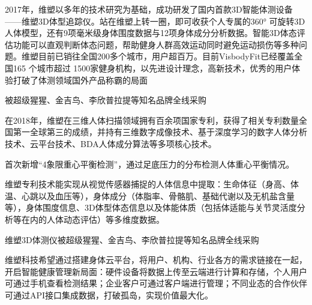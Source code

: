 \documentclass[letterpaper,10pt,english]{sphinxmanual}
\begin{document}
2017年，维塑以多年的技术研究为基础，成功研发了国内首款3D智能体测设备——维塑3D体型追踪仪。站在维塑上转一圈，即可收获个人专属的360°
可旋转3D人体模型，还有9项毫米级身体围度数据与12项身体成分分析数据。智能3D体态评估功能可以直观判断体态问题，帮助健身人群高效运动同时避免运动损伤等多种问题。维塑目前已销往全国200多个城市，用户超百万。目前VisbodyFit已经覆盖全国165
个城市超过
1500家健身机构，以先进设计理念，高新技术，优秀的用户体验打破了体测领域国外产品称霸的局面
%
\begin{footnote}[763]\sphinxAtStartFootnote
{}
%
\end{footnote}
被超级猩猩、金吉鸟、李欣普拉提等知名品牌全线采购
%
\begin{footnote}[764]\sphinxAtStartFootnote
{}
%
\end{footnote}

在2018年，维塑在三维人体扫描领域拥有百余项国家专利，获得了相关专利数量全国第一全球第三的成绩，并持有三维数字成像技术、基于深度学习的数字人体分析技术、云平台技术、BDA人体成分算法等多项核心技术。%
\begin{footnote}[765]\sphinxAtStartFootnote
{}
%
\end{footnote}

首次新增“4象限重心平衡检测”，通过足底压力的分布检测人体重心平衡情况。
%
\begin{footnote}[766]\sphinxAtStartFootnote
{}
%
\end{footnote}

维塑专利技术能实现从视觉传感器捕捉的人体信息中提取：生命体征（身高、体温、心跳以及血压等），身体成分（体脂率、骨骼肌、基础代谢以及无机盐含量等），身体围度信息、3D体型体态信息以及体能体质（包括体适能与关节灵活度分析等在内的人体动态评估）等多维度数据。

维塑3D体测仪被超级猩猩、金吉鸟、李欣普拉提等知名品牌全线采购

维塑科技希望通过搭建身体云平台，将用户、机构、行业各方的需求链接在一起，开启智能健康管理新局面：硬件设备将数据上传至云端进行计算和存储，个人用户可通过手机查看检测结果；企业客户可通过客户端进行管理；不同业态的合作伙伴可通过API接口集成数据，打破孤岛，实现价值最大化。%
\begin{footnote}[767]\sphinxAtStartFootnote
{}
%
\end{footnote}
\end{document}
